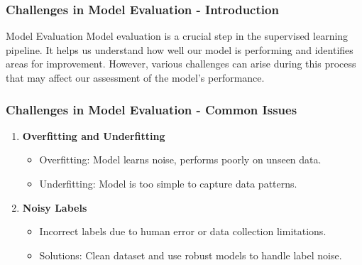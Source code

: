 \documentclass[aspectratio=169]{beamer}
\begin{document}
\begin{frame}[fragile]
    \frametitle{Challenges in Model Evaluation - Introduction}
    \begin{block}{Model Evaluation}
        Model evaluation is a crucial step in the supervised learning pipeline. It helps us understand how well our model is performing and identifies areas for improvement. However, various challenges can arise during this process that may affect our assessment of the model's performance.
    \end{block}
\end{frame}

\begin{frame}[fragile]
    \frametitle{Challenges in Model Evaluation - Common Issues}
    \begin{enumerate}
        \item \textbf{Overfitting and Underfitting}
        \begin{itemize}
            \item Overfitting: Model learns noise, performs poorly on unseen data.
            \item Underfitting: Model is too simple to capture data patterns.
        \end{itemize}
        \item \textbf{Noisy Labels}
        \begin{itemize}
            \item Incorrect labels due to human error or data collection limitations.
            \item Solutions: Clean dataset and use robust models to handle label noise.
        \end{itemize}
    \end{enumerate}
\end{frame}
\end{document}
